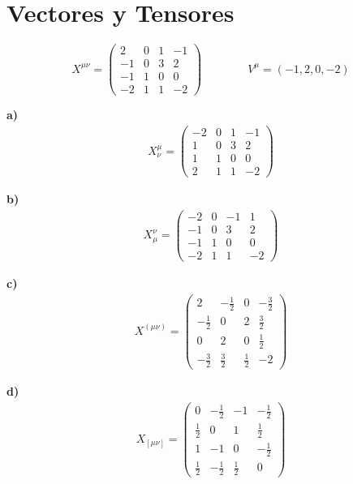 \documentclass{article}
\begin{document}
\section{Vectores y Tensores }
\[
X^{\mu\nu} =
\begin{pmatrix}
2 & 0 & 1 & -1 \\
-1 & 0 & 3 & 2 \\
-1 & 1 & 0 & 0 \\
-2 & 1 & 1 & -2
\end{pmatrix}
 \qquad \qquad
 V^\mu = (-1, 2, 0, -2)
\]

\textbf{a) } 
\begin{gather*}
    X ^ {\mu} _{\nu} =
    \begin{pmatrix}
    -2 & 0 & 1 & -1 \\
    1 & 0 & 3 & 2 \\
    1 & 1 & 0 & 0 \\
    2 & 1 & 1 & -2
    \end{pmatrix}
\end{gather*}

\hfill 

\textbf{b) } 
\begin{gather*}
    X _ {\mu} ^{\nu} =
    \begin{pmatrix}
    -2 & 0 & -1 & 1 \\
    -1 & 0 & 3 & 2 \\
    -1 & 1 & 0 & 0 \\
    -2 & 1 & 1 & -2
    \end{pmatrix}
\end{gather*}

\hfill 

\textbf{c) } 
\begin{gather*}
    X ^ {(\mu\nu)} =
    \begin{pmatrix}
    2 & -\frac{1}{2} & 0 & -\frac{3}{2} \\
    -\frac{1}{2} & 0 & 2 & \frac{3}{2} \\
    0 & 2 & 0 & \frac{1}{2} \\
    -\frac{3}{2} & \frac{3}{2} & \frac{1}{2} & -2
    \end{pmatrix}
\end{gather*}

\hfill 

\textbf{d) } 
\begin{gather*}
    X _ {[\mu\nu]} =
    \begin{pmatrix}
    0 & -\frac{1}{2} & -1 & -\frac{1}{2} \\
    \frac{1}{2} & 0 & 1 & \frac{1}{2} \\
    1 & -1 & 0 & -\frac{1}{2} \\
    \frac{1}{2} & -\frac{1}{2} & \frac{1}{2} & 0
    \end{pmatrix}
\end{gather*}
\end{document}
